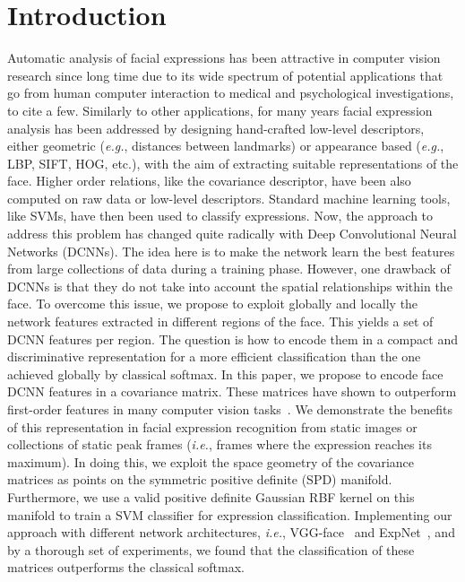 \documentclass{bmvc2k}
\begin{document}
\section{Introduction}
\label{sec:intro}
Automatic analysis of facial expressions has been attractive in computer vision research since long time due to its wide spectrum of potential applications that go from human computer interaction to medical and psychological investigations, to cite a few. 
Similarly to other applications, for many years facial expression analysis has been addressed by designing hand-crafted low-level descriptors, either geometric (\emph{e.g.}, distances between landmarks) or appearance based (\emph{e.g.}, LBP, SIFT, HOG, etc.), with the aim of extracting suitable representations of the face. 
Higher order relations, like the covariance descriptor, have been also computed on raw data or low-level descriptors. 
Standard machine learning tools, like SVMs, have then been used to classify expressions. 
Now, the approach to address this problem has changed quite radically with Deep Convolutional Neural Networks (DCNNs). The idea here is to make the network learn the best features from large collections of data during a training phase.
However, one drawback of DCNNs is that they do not take into account the spatial relationships within the face. To overcome this issue, we propose to exploit globally and locally the network features extracted in different regions of the face. 
This yields a set of DCNN features per region. The question is how to encode them in a compact and discriminative representation for a more efficient classification than the one achieved globally by classical softmax. 
In this paper, we propose to encode face DCNN features in a covariance matrix. These matrices have shown to outperform first-order features in many computer vision tasks~\cite{tuzel:2006,tuzel:2008}. 
We demonstrate the benefits of this representation in facial expression recognition from static images or collections of static peak frames (\emph{i.e.}, frames where the expression reaches its maximum). In doing this, we exploit the space geometry of the covariance matrices as points on the symmetric positive definite (SPD) manifold. Furthermore, we use a valid positive definite Gaussian RBF kernel on this manifold to train a SVM classifier for expression classification. Implementing our approach with different network architectures, \emph{i.e.}, VGG-face~\cite{parkhi2015deep} and ExpNet~\cite{ding2017facenet2expnet}, and by a thorough set of experiments, we found that the classification of these matrices outperforms the classical softmax. 
\end{document}
